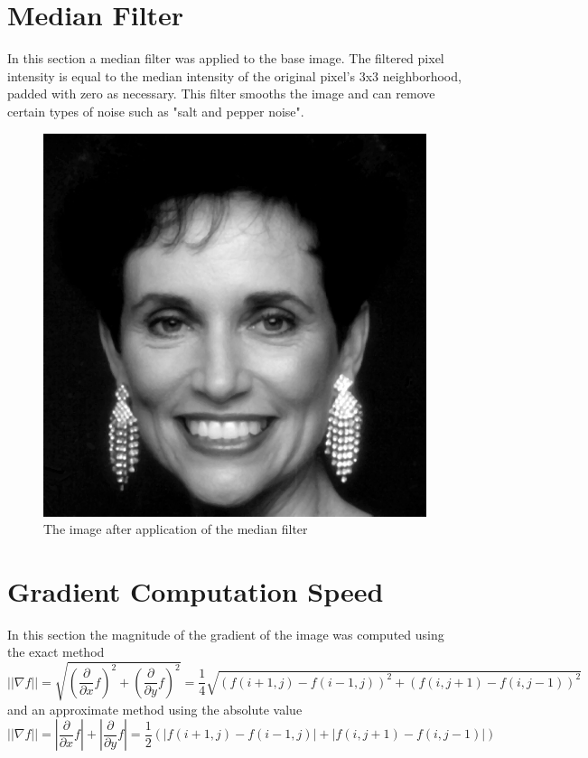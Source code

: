 \documentclass[12pt,letterpaper]{article}
\begin{document}
\clearpage 
\newpage

\section{Median Filter}

In this section a median filter was applied to the base image. The filtered pixel intensity is equal to the median intensity of the original pixel's 3x3 neighborhood, padded with zero as necessary. This filter smooths the image and can remove certain types of noise such as "salt and pepper noise". 

\begin{figure}[ht]
\centering
\includegraphics[scale=0.135]{woman/median} 
\caption{\small{The image after application of the median filter}
\label{fig:med} }
\end{figure}

\clearpage 
\newpage
\section{Gradient Computation Speed}
In this section the magnitude of the gradient of the image was computed using the exact method \[
||\nabla f|| = \sqrt{ \left( \frac{\partial}{\partial x} f \right)^2 + \left( \frac{\partial}{\partial y} f \right)^2} = \frac{1}{4} \sqrt{(f(i + 1, j) - f(i - 1, j))^2 + (f(i, j + 1) - f(i, j - 1))^2}
\]
and an approximate method using the absolute value \[
||\nabla f|| = \left|\frac{\partial}{\partial x} f\right| + \left| \frac{\partial}{\partial y} f \right| = \frac{1}{2}\left(|f(i + 1, j) - f(i - 1, j)| + |f(i, j + 1) - f(i, j - 1)|\right)
\]
\end{document}
